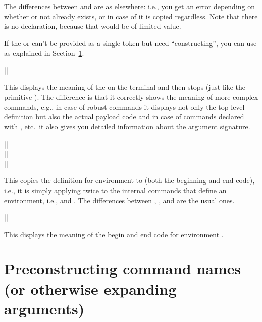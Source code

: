 \documentclass{ltxguide}
\begin{document}
The differences between  and  are as
elsewhere: i.e., you get an error depending on whether or not
 already exists, or in case of  it is copied
regardless. Note that there is no  declaration, because
that would be of limited value.


If the  or  can't be provided as a single
token but need \enquote{constructing}, you can use 
as explained in
Section~\ref{sec:preconstructing-csnames}.

\begin{decl}
  |\ShowCommand|       
\end{decl}

This displays the meaning of the  on the terminal and then
stops (just like the primitive ). The difference is that it
correctly shows the meaning of more complex commands, e.g., in case of
robust commands it displays not only the top-level definition but
also the actual payload code and in case of commands declared with
, etc.\ it also gives you detailed information
about the argument signature.

\begin{decl}
  |\NewEnvironmentCopy|         \\
  |\RenewEnvironmentCopy|       \\
  |\DeclareEnvironmentCopy|    
\end{decl}

This copies the definition for environment  to
 (both the beginning and end code), i.e., it is simply
applying  twice to the internal commands that
define an environment, i.e., \cs{} and .
The differences between , , and
 are the usual ones.

\begin{decl}
  |\ShowEnvironment|       
\end{decl}
This displays the meaning of the begin and end code for environment .




\section[Preconstructing command names \\ (or otherwise expanding arguments)]
        {Preconstructing command names (or otherwise expanding arguments)}
\label{sec:preconstructing-csnames}
\end{document}
